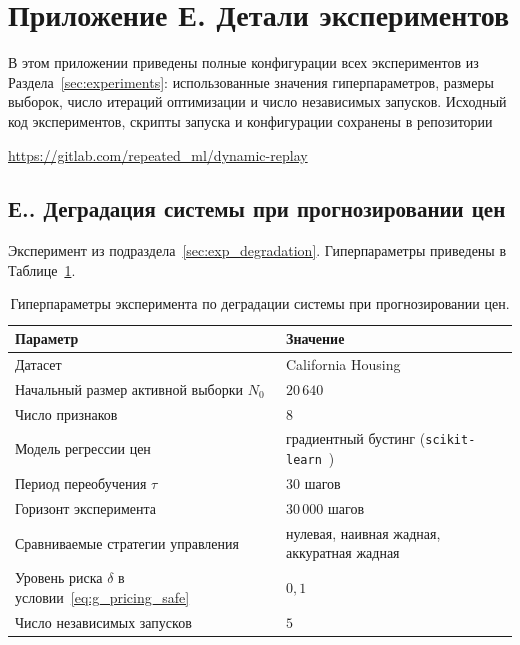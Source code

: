 \documentclass[a4paper,14pt,oneside,openany]{extarticle}
\begin{document}
\newpage
\cleardoublepage
{}
{}
\section*{Приложение Е. Детали экспериментов}\label{app:hyperparams}

В этом приложении приведены полные конфигурации всех экспериментов из Раздела~\ref{sec:experiments}: использованные значения гиперпараметров, размеры выборок, число итераций оптимизации и число независимых запусков. Исходный код экспериментов, скрипты запуска и конфигурации сохранены в репозитории

\begin{center}
\url{https://gitlab.com/repeated_ml/dynamic-replay}
\end{center}

\setcounter{appthm}{0}
\renewcommand{\theappthm}{Е.}

\subsection*{\theappthm. Деградация системы при прогнозировании цен}\label{app:hyp_degradation}

Эксперимент из подраздела~\ref{sec:exp_degradation}. Гиперпараметры приведены в Таблице~\ref{tab:hyp_degradation}.

\begin{table}[h!]
\centering
\small
\caption{Гиперпараметры эксперимента по деградации системы при прогнозировании цен.}
\label{tab:hyp_degradation}
\begin{tabularx}{\linewidth}{lX}
\toprule
Параметр & Значение \\
\midrule
Датасет & California Housing~\cite{pace1997sparse} \\
Начальный размер активной выборки $N_0$ & $20\,640$ \\
Число признаков & $8$ \\
Модель регрессии цен & градиентный бустинг (\texttt{scikit-learn}~\cite{pedregosa2011scikit}) \\
Период переобучения $\tau$ & $30$ шагов \\
Горизонт эксперимента & $30\,000$ шагов \\
Сравниваемые стратегии управления & нулевая, наивная жадная, аккуратная жадная \\
Уровень риска $\delta$ в условии~\eqref{eq:g_pricing_safe} & $0{,}1$ \\
Число независимых запусков & $5$ \\
\bottomrule
\end{tabularx}
\end{table}
\end{document}
